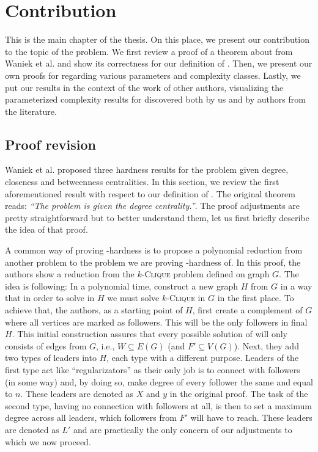 \chapter{Contribution}\label{chapter:contribution}

This is the main chapter of the thesis.
On this place, we present our contribution to the topic of the \HL problem.
We first review a proof of a theorem about \HLdeg from Waniek et al. \cite{Waniek2017} and show
its correctness for our definition of \HL.
Then, we present our own proofs for \HLdeg regarding various parameters and complexity classes.
Lastly, we put our results in the context of the work of other authors,
visualizing the parameterized complexity results for \HLdeg discovered both by us and by authors
from the literature.


\section{Proof revision}\label{section:proofRevision}

Waniek et al. \cite{Waniek2017} proposed three hardness results for the \HL problem given degree, closeness and betweenness
centralities. In this section, we review the first aforementioned result with respect to our definition of \HLshort.
The original theorem reads: \emph{``The \HL problem is \NPc given the degree centrality.''}.
The proof adjustments are pretty straightforward but to better understand them,
let us first briefly describe the idea of that proof.

A common way of proving \NP-hardness is to propose a polynomial reduction from another \NPh problem to the
problem we are proving \NP-hardness of.
In this proof, the authors show a reduction from the $k$-\textsc{Clique} problem defined on graph $G$.
The idea is following: In a polynomial time, construct a new graph $H$ from $G$ in a way that
in order to solve \HL in $H$ we must solve $k$-\textsc{Clique} in $G$ in the first place.
To achieve that, the authors, as a starting point of $H$, first create a complement of $G$ 
where all vertices are marked as followers. This will be the only followers in final $H$.
This initial construction assures that every possible solution of \HLshort will only consists of edges from $G$, i.e.,
$W \subseteq E(G)$ (and $F' \subseteq V(G)$).
Next, they add two types of leaders into $H$, each type with a different purpose.
Leaders of the first type act like ``regularizators'' as their only job is to connect with followers (in some way) and,
by doing so, make degree of every follower the same and equal to $n$.
These leaders are denoted as $X$ and $y$ in the original proof.
The task of the second type, having no connection with followers at all,
is then to set a maximum degree across all leaders, which followers from $F'$ will have to reach.
These leaders are denoted as $L'$ and are practically the only concern of our adjustments to which we now proceed.

